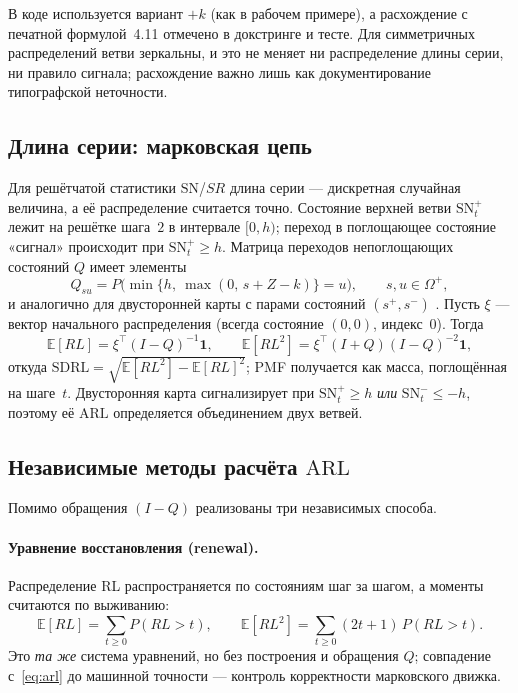 \documentclass[11pt,a4paper]{article}
\newcommand{\SN}{\mathrm{SN}}
\newcommand{\ARL}{\mathrm{ARL}}
\newcommand{\SDRL}{\mathrm{SDRL}}
\newcommand{\E}{\mathbb{E}}
\begin{document}
\noindent
В коде используется вариант $+k$ (как в рабочем примере), а расхождение
с печатной формулой~4.11 отмечено в докстринге и тесте. Для симметричных
распределений ветви зеркальны, и это не меняет ни распределение длины
серии, ни правило сигнала; расхождение важно лишь как документирование
типографской неточности.

\subsection{Длина серии: марковская цепь}
\label{sec:math-markov}

Для решётчатой статистики $\SN$/$SR$ длина серии --- дискретная случайная
величина, а её распределение считается точно. Состояние верхней ветви
$\SN_t^+$ лежит на решётке шага~$2$ в интервале $[0,h)$; переход в
поглощающее состояние «сигнал» происходит при $\SN_t^+ \ge h$. Матрица
переходов непоглощающих состояний $Q$ имеет элементы
\begin{equation}
Q_{su} = P\bigl(\min\{h,\ \max(0,\, s + Z - k)\} = u\bigr),\qquad
s,u \in \Omega^+,
\label{eq:Q}
\end{equation}
и аналогично для двусторонней карты с парами состояний $(s^+, s^-)$
\cite[ур.~4.9, 4.12, стр.~203, 206]{Chakraborti2019}. Пусть $\xi$ ---
вектор начального распределения (всегда состояние $(0,0)$, индекс~$0$).
Тогда \cite[ур.~3.22--3.24, стр.~112]{Chakraborti2019}
\begin{equation}
\E[RL] = \xi^{\top}(I-Q)^{-1}\mathbf{1},\qquad
\E[RL^2] = \xi^{\top}(I+Q)(I-Q)^{-2}\mathbf{1},
\label{eq:arl}
\end{equation}
откуда $\SDRL = \sqrt{\E[RL^2]-\E[RL]^2}$; PMF получается как масса,
поглощённая на шаге~$t$. Двусторонняя карта сигнализирует при
$\SN_t^+ \ge h$ \emph{или} $\SN_t^- \le -h$, поэтому её $\ARL$ определяется
объединением двух ветвей.

\subsection{Независимые методы расчёта $\ARL$}
\label{sec:math-alt}

Помимо обращения $(I-Q)$ реализованы три независимых способа.

\paragraph{Уравнение восстановления (renewal).} Распределение RL
распространяется по состояниям шаг за шагом, а моменты считаются по
выживанию:
\begin{equation}
\E[RL] = \sum_{t\ge 0} P(RL > t),\qquad
\E[RL^2] = \sum_{t\ge 0} (2t+1)\,P(RL > t).
\label{eq:renewal}
\end{equation}
Это \emph{та же} система уравнений, но без построения и обращения $Q$;
совпадение с~\eqref{eq:arl} до машинной точности --- контроль корректности
марковского движка.
\end{document}
